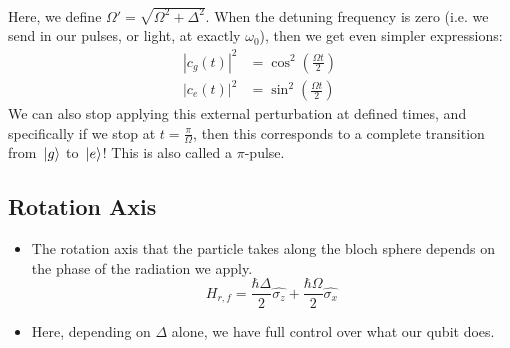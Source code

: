 \begin{itemize}
\begin{align*}
		\end{align*} 
		Here, we define \( \Omega' = \sqrt{\Omega^2 + \Delta^2}  \). When the detuning frequency is zero (i.e. 
		we send in our pulses, or light, at exactly \( \omega_0 \)), then we get even simpler expressions:
		\begin{align*}
			|c_g(t)|^2 &= \cos^2\left( \frac{\Omega t}{2} \right)  \\
			|c_e(t)|^2&= \sin^2\left( \frac{\Omega t}{2} \right)  
		\end{align*}
		We can also stop applying this external perturbation at defined times, and specifically if we 
		stop at \( t = \frac{\pi}{\Omega} \), then this corresponds to a complete transition from 
		\( \ket*{g} \) to \( \ket*{e} \)! This is also called a \( \pi \)-pulse. 
\end{itemize}
\subsection{Rotation Axis}
\begin{itemize}
	\item The rotation axis that the particle takes along the bloch sphere depends on the phase of the radiation we 
		apply. 
		\[
		H_{r, f} = \frac{\hbar \Delta}{2}\hat{\sigma_z} + \frac{\hbar \Omega}{2}\hat{\sigma_x}
		\] 
	\item Here, depending on \( \Delta \) alone, we have full control over what our qubit does.  
\end{itemize}
